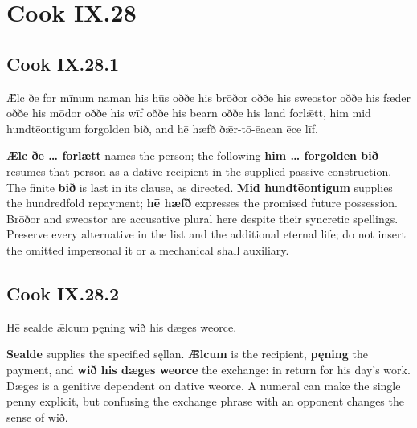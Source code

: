 \section*{Cook IX.28}

\subsection*{Cook IX.28.1}

\par\begin{minipage}{\linewidth}\raggedright
Ǣlc ðe for mīnum naman his hūs oððe his brōðor oððe his sweostor oððe his fæder oððe his mōdor oððe his wīf oððe his bearn oððe his land forlǣtt, him mid hundtēontigum forgolden bið, and hē hæfð ðǣr-tō-ēacan ēce līf.

\textbf{Ǣlc ðe … forlǣtt} names the person; the following \textbf{him … forgolden bið} resumes that person as a dative recipient in the supplied passive construction. The finite \textbf{bið} is last in its clause, as directed. \textbf{Mid hundtēontigum} supplies the hundredfold repayment; \textbf{hē hæfð} expresses the promised future possession. Brōðor and sweostor are accusative plural here despite their syncretic spellings. Preserve every alternative in the list and the additional eternal life; do not insert the omitted impersonal it or a mechanical shall auxiliary.

\end{minipage}\par\addvspace{4pt}

\subsection*{Cook IX.28.2}

\par\begin{minipage}{\linewidth}\raggedright
Hē sealde ǣlcum pęning wið his dæges weorce.

\textbf{Sealde} supplies the specified sęllan. \textbf{Ǣlcum} is the recipient, \textbf{pęning} the payment, and \textbf{wið his dæges weorce} the exchange: in return for his day’s work. Dæges is a genitive dependent on dative weorce. A numeral can make the single penny explicit, but confusing the exchange phrase with an opponent changes the sense of wið.

\end{minipage}\par\addvspace{4pt}

